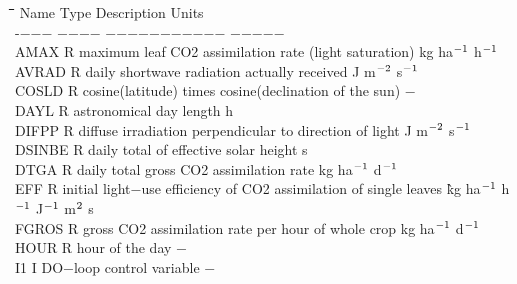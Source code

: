 \documentclass[11pt]{article}
\begin{document}
\begin{tabbing}
\hspace{1.27cm}\=\hspace{1.27cm}\=\hspace{1.27cm}\=\hspace{1.27cm}\=%
\hspace{1.27cm}\=\hspace{1.27cm}\=\hspace{1.27cm}\=\hspace{1.27cm}\=%
\hspace{1.27cm}\=\hspace{1.27cm}\=\kill
Name    \> \> Type   \> Description                                        \> \> \> \> \> \> \> Units\\
-$-$$-$$-$    \> \> $-$$-$$-$$-$   \> $-$$-$$-$$-$$-$$-$$-$$-$$-$$-$$-$                                        \> \> \> \> \> \> \> $-$$-$$-$$-$$-$\\
AMAX    \> \> R   \> maximum leaf CO2 assimilation rate (light saturation)\> \> \> \> \> \> \> kg ha$^{{\rm -1}}$ h$^{{\rm -1}}$\\
AVRAD   \> \> R   \> daily shortwave radiation actually received  \> \> \> \> \> \> \> J m$^{{\rm -2}}$ s$^{{\rm -1}}$ \\
COSLD   \> \> R   \> cosine(latitude) times cosine(declination of the sun)           \> \> \> \> \> \> \> $-$\\
DAYL    \> \> R   \> astronomical day length\> \> \>  \> \> \> \> h\\
DIFPP\> \> R\> diffuse irradiation perpendicular to direction of light\> \> \> \> \> \> \> J m$^{{\rm -2}}$ s$^{{\rm -1}}$\\
DSINBE\> \> R\> daily total of effective solar height\> \> \> \> \> \> \> s\\
DTGA    \> \> R   \> daily total gross CO2  assimilation rate       \> \> \> \> \> \> \> kg ha$^{{\rm -1}}$ d$^{{\rm -1}}$ \\
EFF     \> \> R   \> initial light$-$use efficiency of CO2 assimilation of single leaves \`kg ha$^{{\rm -1}}$ h$^{{\rm -1}}$ J$^{{\rm -1}}$ m$^{{\rm 2}}$ s\\
FGROS   \> \> R   \> gross CO2  assimilation rate per hour of whole crop        \> \> \> \> \> \> \> kg ha$^{{\rm -1}}$ d$^{{\rm -1}}$ \\
HOUR    \> \> R   \> hour of the day                                    \> \> \> \> \> \> \> $-$\\
I1     \> \> I   \> DO$-$loop control variable                           \> \> \> \> \> \> \> $-$\\
$$
\end{tabbing}
\end{document}
